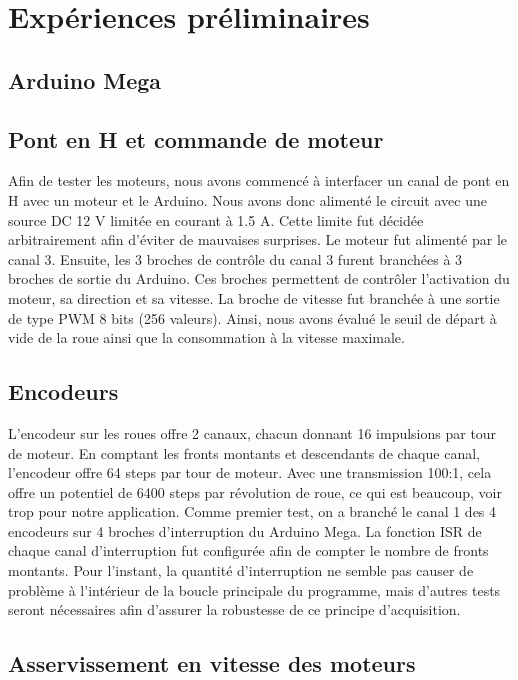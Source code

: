 
\chapter{Expériences préliminaires}

\section{Arduino Mega}

\section{Pont en H et commande de moteur}

Afin de tester les moteurs, nous avons commencé à interfacer un canal de pont en H avec un moteur et le Arduino. Nous avons donc alimenté le circuit avec une source DC 12 V limitée en courant à 1.5 A. Cette limite fut décidée arbitrairement afin d'éviter de mauvaises surprises. Le moteur fut alimenté par le canal 3. Ensuite, les 3 broches de contrôle du canal 3 furent branchées à 3 broches de sortie du Arduino. Ces broches permettent de contrôler l'activation du moteur, sa direction et sa vitesse.  La broche de vitesse fut branchée à une sortie de type PWM 8 bits (256 valeurs). Ainsi, nous avons évalué le seuil de départ à vide de la roue ainsi que la consommation à la vitesse maximale. 

\section{Encodeurs}

L'encodeur sur les roues offre 2 canaux, chacun donnant 16 impulsions par tour de moteur. En comptant les fronts montants et descendants de chaque canal, l'encodeur offre 64 steps par tour de moteur. Avec une transmission 100:1, cela offre un potentiel de 6400 steps par révolution de roue, ce qui est beaucoup, voir trop pour notre application.  Comme premier test, on a branché le canal 1 des 4 encodeurs sur 4 broches d'interruption du Arduino Mega. La fonction ISR de chaque canal d'interruption fut configurée afin de compter le nombre de fronts montants. Pour l'instant, la quantité d'interruption ne semble pas causer de problème à l'intérieur de la boucle principale du programme, mais d'autres tests seront nécessaires afin d'assurer la robustesse de ce principe d'acquisition.

\section{Asservissement en vitesse des moteurs}

